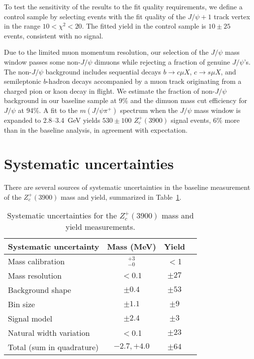 \documentclass[aps,prd,twocolumn,superscriptaddress,groupedaddress,floatfix]{revtex4}
\begin{document}
To test the sensitivity of the results to the fit quality requirements, we define a control
sample by selecting events with the  fit quality of the $J/\psi + 1$ track vertex
in the range $10<\chi^2 < 20$. 
The fitted yield in the control sample is $10\pm25$ events, consistent with no signal.


Due to the limited muon momentum resolution, our selection of the $J/\psi$ mass window
passes some non-$J/\psi$ dimuons while rejecting a fraction of genuine $J/\psi$'s.
The  non-$J/\psi$ background includes sequential decays $b \rightarrow c \mu X$,
 $c \rightarrow s \mu X$, and semileptonic $b$-hadron decays accompanied by
a muon track originating from a charged pion or kaon decay in flight.
We estimate the fraction of non-$J/\psi$ background in our baseline sample 
at 9\% and the dimuon mass cut efficiency for $J/\psi$ at  94\%.
A fit  to the $m(J/\psi \pi^+)$ spectrum when  the   $J/\psi$ mass window is expanded
  to 2.8--3.4~GeV
yields  $530\pm100$ $Z_c^+(3900)$ signal events, 6\% more than in the baseline analysis,
 in agreement with expectation.





\section{Systematic uncertainties}


There are several sources of systematic uncertainties in the  baseline measurement of the  $Z_c^+(3900)$ 
mass and yield, summarized in Table~\ref{tab:syst}.


\begin{table}[h]
\caption{\label{tab:syst} Systematic uncertainties for the  $Z_c^+(3900)$
mass and yield measurements. }
\begin{ruledtabular}
\def\arraystretch{1.1}
\begin{tabular}{lccc}
Systematic uncertainty & Mass (MeV)   & Yield\\
\hline
Mass calibration & $^{+3}_{-0}$ & $<$1\\
Mass resolution   & $<0.1$  &  $\pm 27$ \\
Background shape & $\pm0.4$ & $\pm53$   \\
Bin size   & $\pm 1.1$  &  $\pm 9$\\
Signal model & $\pm 2.4$ & $\pm3$\\
Natural width variation & $<$0.1 &  $\pm 23$\\
\hline 
Total (sum in quadrature) & $-2.7,+4.0$& $\pm 64$\\
\end{tabular}
\end{ruledtabular}
\end{table}
\end{document}
